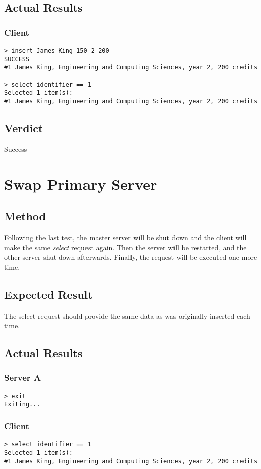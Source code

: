 \documentclass[a4paper,11pt]{article}
\begin{document}
\subsection{Actual Results}
\subsubsection{Client}
\begin{verbatim}
> insert James King 150 2 200
SUCCESS
#1 James King, Engineering and Computing Sciences, year 2, 200 credits

> select identifier == 1
Selected 1 item(s):
#1 James King, Engineering and Computing Sciences, year 2, 200 credits
\end{verbatim}

\subsection{Verdict}
Success

\section{Swap Primary Server}
\subsection{Method}
Following the last test, the master server will be shut down and the client will make the same \emph{select} request again. Then the server will be restarted, and the other server shut down afterwards. Finally, the request will be executed one more time.

\subsection{Expected Result}
The select request should provide the same data as was originally inserted each time.

\subsection{Actual Results}
\subsubsection{Server A}
\begin{verbatim}
> exit
Exiting...
\end{verbatim}

\subsubsection{Client}
\begin{verbatim}
> select identifier == 1
Selected 1 item(s):
#1 James King, Engineering and Computing Sciences, year 2, 200 credits
\end{verbatim}
\end{document}
